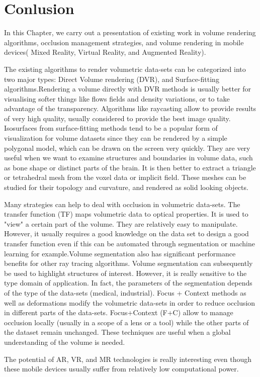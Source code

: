 \section{Conlusion}
In this Chapter, we carry out a presentation of existing work in volume rendering algorithms, occlusion management strategies, and volume rendering in mobile devices( Mixed Reality, Virtual Reality, and Augmented Reality).

 The existing algorithms to render volumetric data-sets  can be categorized into two major types: Direct Volume rendering (DVR), and Surface-fitting algorithms.Rendering a volume directly with DVR methods is usually better for visualising softer things like flows fields and density variations, or to take advantage of the transparency. Algorithms like raycasting allow to provide results of very high quality, usually considered to provide the best image quality. 
Isosurfaces from surface-fitting methods tend to be a popular form of visualization for volume datasets since they can be rendered by a simple polygonal model, which can be drawn on the screen very quickly. They are very useful when we want to examine structures and boundaries in volume data, such as bone shape or distinct parts of the brain. It is then better to extract a triangle or tetrahedral mesh from the voxel data or implicit field. These meshes can be studied for their topology and curvature, and rendered as solid looking objects.


Many strategies can help to deal with occlusion in volumetric data-sets. The transfer function (TF) maps volumetric data to optical properties. It is used to "view" a certain part of the volume. They are relatively easy to manipulate. However, it usually requires a good knowledge on the data set to design a good transfer function even if this can be automated through segmentation or machine learning for example.Volume segmentation also has significant performance benefits for other ray tracing algorithms. Volume segmentation can subsequently be used to highlight structures of interest. However, it is really sensitive to the type domain of application. In fact, the parameters of the segmentation depends of the type of the data-sets (medical, industrial).  Focus + Context methods as well as deformations modify the volumetric data-sets in order to reduce occlusion in different parts of the data-sets. Focus+Context (F+C) allow to manage occlusion locally (usually in a scope of a lens or a tool) while the other parts of the dataset remain unchanged. These techniques are useful when a global understanding of the volume is needed.


 The potential of AR, VR, and MR technologies is really interesting even though these mobile devices usually suffer from relatively low computational power.   